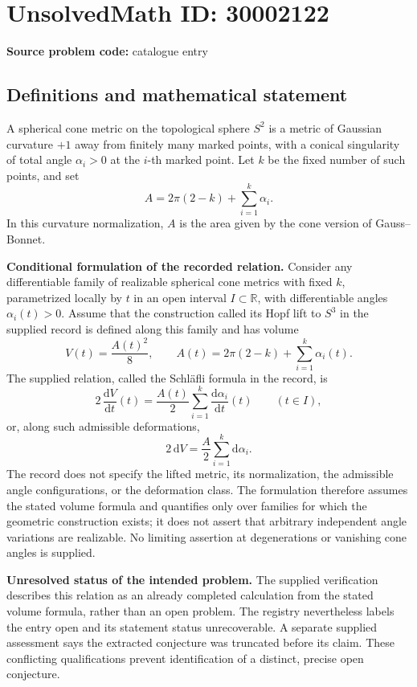 \documentclass[11pt]{article}
\newcommand{\R}{\mathbb{R}}
\begin{document}
\section*{UnsolvedMath ID: 30002122}
\textbf{Source problem code:} catalogue entry
\subsection{Definitions and mathematical statement}
A spherical cone metric on the topological sphere \(S^2\) is a metric of Gaussian curvature \(+1\) away from finitely many marked points, with a conical singularity of total angle \(\alpha_i>0\) at the \(i\)-th marked point. Let \(k\) be the fixed number of such points, and set
\[
A=2\pi(2-k)+\sum_{i=1}^{k}\alpha_i.
\]
In this curvature normalization, \(A\) is the area given by the cone version of Gauss--Bonnet.

\textbf{Conditional formulation of the recorded relation.} Consider any differentiable family of realizable spherical cone metrics with fixed \(k\), parametrized locally by \(t\) in an open interval \(I\subset\R\), with differentiable angles \(\alpha_i(t)>0\). Assume that the construction called its Hopf lift to \(S^3\) in the supplied record is defined along this family and has volume
\[
V(t)=\frac{A(t)^2}{8},\qquad
A(t)=2\pi(2-k)+\sum_{i=1}^{k}\alpha_i(t).
\]
The supplied relation, called the Schl\"afli formula in the record, is
\[
2\,\frac{\mathrm dV}{\mathrm dt}(t)
=\frac{A(t)}{2}\sum_{i=1}^{k}\frac{\mathrm d\alpha_i}{\mathrm dt}(t)
\qquad(t\in I),
\]
or, along such admissible deformations,
\[
2\,\mathrm dV=\frac{A}{2}\sum_{i=1}^{k}\mathrm d\alpha_i.
\]
The record does not specify the lifted metric, its normalization, the admissible angle configurations, or the deformation class. The formulation therefore assumes the stated volume formula and quantifies only over families for which the geometric construction exists; it does not assert that arbitrary independent angle variations are realizable. No limiting assertion at degenerations or vanishing cone angles is supplied.

\textbf{Unresolved status of the intended problem.} The supplied verification describes this relation as an already completed calculation from the stated volume formula, rather than an open problem. The registry nevertheless labels the entry open and its statement status unrecoverable. A separate supplied assessment says the extracted conjecture was truncated before its claim. These conflicting qualifications prevent identification of a distinct, precise open conjecture.
\end{document}
